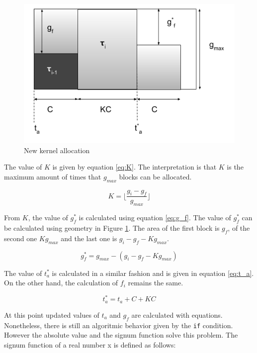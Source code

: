 \documentclass[
  12pt,
  a4paperpaper,
]{report}
\begin{document}
\begin{figure}
\centering
\includegraphics{source/figures/free_blocks_alg.png}
\caption{New kernel allocation \label{img:free_blocks_alg}}
\end{figure}

The value of \(K\) is given by equation \ref{eq:K}. The
interpretation is that \(K\) is the maximum amount of times that
\(g_{max}\) blocks can be allocated.

\begin{equation}
K = \lfloor \frac{g_i - g_f}{g_{max}} \rfloor
\label{eq:K}
\end{equation}

From \(K\), the value of \(g^{*}_f\) is calculated using equation \ref{eq:g_f}. 
The value of \(g^{*}_f\) can be calculated using geometry in Figure \ref{img:free_blocks_alg}.
The area of the first block is \(g_f\), of the second one \(Kg_{max}\) and the last one is \(g_i - g_f - K g_{max}\).

\begin{equation}
g^{*}_f = g_{max} - (g_i -  g_f - K g_{max} )
\label{eq:g_f}
\end{equation}

The value of \(t^{*}_a\) is calculated in a similar fashion and is given
in equation \ref{eq:t_a}. On the other hand, the calculation of \(f_i\)
remains the same.

\begin{equation}
t^{*}_a = t_a + C+ KC
\label{eq:t_a}
\end{equation}

At this point updated values of \(t_a\) and \(g_f\) are calculated with equations.
Nonetheless, there is still an algoritmic behavior given by the \texttt{if} condition. 
However the absolute value and the signum function solve this problem. 
The signum function of a real number x is defined as follows:
\end{document}
